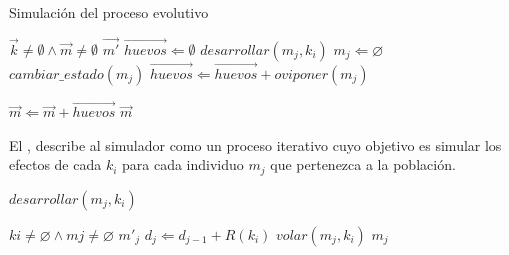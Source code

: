 \begin{algorithm}
\caption{Simulación del proceso evolutivo}
\label{alg:simulador-evolutivo}
\begin{algorithmic}[1]
    \REQUIRE $\vec{k}\neq \emptyset \land \vec{m} \neq \emptyset$
    \ENSURE $\vec{m'}$
        \STATE $\vec{huevos} \Leftarrow \emptyset$
            \STATE $desarrollar(m_{j}, k_{i})$
                \STATE {}
                \STATE $m_{j} \Leftarrow \varnothing $
                \STATE $ cambiar\_estado(m_{j}) $
                \STATE $\vec{huevos} \Leftarrow \vec{huevos} + oviponer(m_{j})$
            \ENDIF
        \ENDFOR

            \STATE {}
            \STATE $\vec{m} \Leftarrow  \vec{m} + \vec{huevos}$
        \ENDIF
    \ENDFOR
    \RETURN $\vec{m}$
\end{algorithmic}
\end{algorithm}

El , describe al simulador como un proceso iterativo cuyo objetivo
es simular los efectos de cada $k_{i}$ para cada individuo $m_{j}$ que pertenezca a la población.


\begin{algorithm}
\caption{$desarrollar(m_{j}, k_{i})$}
\label{alg:desarrollo}
\begin{algorithmic}[1]
    \REQUIRE $ k{i} \neq \varnothing \land m{j} \neq \varnothing$
    \ENSURE $m'_{j}$
            \STATE $d_{j} \Leftarrow d_{j -1} + R(k_{i})$
            \STATE $volar(m_{j}, k_{i})$
            \ENDIF
    \RETURN $m_{j}$
\end{algorithmic}
\end{algorithm}
